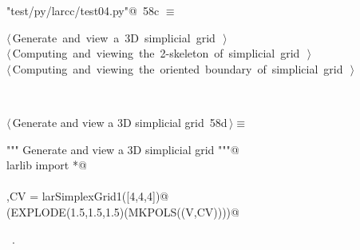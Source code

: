 \documentclass[11pt,oneside]{article}    %
\begin{document}
\begin{flushleft} \small
\begin{minipage}{\linewidth} \label{scrap105}
\protect{}\verb@"test/py/larcc/test04.py"@\nobreak\ {\footnotesize 58c }$\equiv$
\vspace{-1ex}
\begin{list}{}{} \item
\mbox{}\verb@@\hbox{$\langle\,$Generate and view a 3D simplicial grid\nobreak\ {\footnotesize {}}$\,\rangle$}\verb@@\\
\mbox{}\verb@@\hbox{$\langle\,$Computing and viewing the 2-skeleton of simplicial grid\nobreak\ {\footnotesize {}}$\,\rangle$}\verb@@\\
\mbox{}\verb@@\hbox{$\langle\,$Computing and viewing the oriented boundary of simplicial grid\nobreak\ {\footnotesize {}}$\,\rangle$}\verb@@\\
\mbox{}\verb@@{\NWsep}
\end{list}
\vspace{-2ex}
\end{minipage}\\[4ex]
\end{flushleft}


\begin{flushleft} \small \label{scrap106}
\protect{}$\langle\,$Generate and view a 3D simplicial grid\nobreak\ {\footnotesize 58d}$\,\rangle\equiv$
\vspace{-1ex}
\begin{list}{}{} \item
\mbox{}\verb@""" Generate and view a 3D simplicial grid """@\\
\mbox{}\verb@from larlib import *@\\
\mbox{}\verb@@\\
\mbox{}\verb@V,CV = larSimplexGrid1([4,4,4])@\\
\mbox{}\verb@VIEW(EXPLODE(1.5,1.5,1.5)(MKPOLS((V,CV))))@\\
\mbox{}\verb@@{\NWsep}
\end{list}
\vspace{-1ex}
\footnotesize\addtolength{\baselineskip}{-1ex}
\begin{list}{}{\setlength{\itemsep}{-\parsep}\setlength{\itemindent}{-\leftmargin}}
\item \NWtxtMacroRefIn\ .
\end{list}
\end{flushleft}
\end{document}
